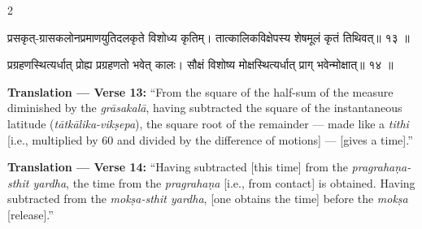 \documentclass[11pt,a4paper]{article}
\newcommand{\dev}[1]{{\devanagarifont #1}}
\newenvironment{sanskritverse}{%
  \begin{center}\begin{minipage}{0.95\textwidth}
  \setlength{\leftskip}{1em}
  \setlength{\rightskip}{1em}
  \dev
}{\end{minipage}\end{center}}
\begin{document}
\begin{paracol}{2}

\begin{sanskritverse}
प्रसकृत्-ग्रासकलोनप्रमाणयुतिदलकृते विशोध्य कृतिम्।
तात्कालिकविक्षेपस्य शेषमूलं कृतं तिथिवत्॥ १३ ॥
\end{sanskritverse}

\begin{sanskritverse}
प्रग्रहणस्थित्यर्धात् प्रोह्य प्रग्रहणतो भवेत् कालः।
सौक्षं विशोष्य मोक्षस्थित्यर्धात् प्राग् भवेन्मोक्षात्॥ १४ ॥
\end{sanskritverse}

\switchcolumn

\textbf{Translation — Verse 13:} ``From the square of the half-sum of the measure diminished by the \textit{grāsakalā}, having subtracted the square of the instantaneous latitude (\textit{tātkālika-vikṣepa}), the square root of the remainder --- made like a \textit{tithi} [i.e., multiplied by 60 and divided by the difference of motions] --- [gives a time].''

\textbf{Translation — Verse 14:} ``Having subtracted [this time] from the \textit{pragrahaṇa-sthit yardha}, the time from the \textit{pragrahaṇa} [i.e., from contact] is obtained. Having subtracted from the \textit{mokṣa-sthit yardha}, [one obtains the time] before the \textit{mokṣa} [release].''

\end{paracol}

\vspace{0.5em}
\end{document}
